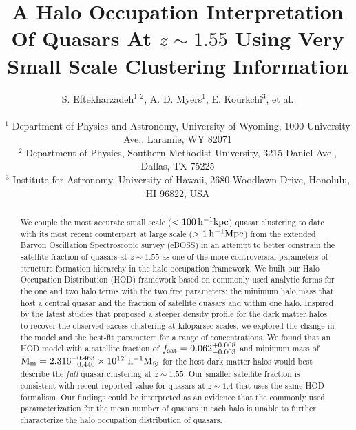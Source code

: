 \documentclass[useAMS,usenatbib]{mn2e}
\begin{document}

\title[Quasar HOD at $z \sim 1.5$]{A Halo Occupation Interpretation Of Quasars At $z\sim1.55$ Using Very Small Scale Clustering Information}
% 
\author[Eftekharzadeh et al.]{S. Eftekharzadeh$^{1,2}$,  A. D. Myers$^{1}$, E. Kourkchi$^{3}$, et al.\\
\\
$^{1}$ Department of Physics and Astronomy, University of Wyoming, 1000 University Ave., Laramie, WY 82071\\
$^{2}$ Department of Physics, Southern Methodist University, 3215 Daniel Ave., Dallas, TX 75225\\
$^{3}$ Institute for Astronomy, University of Hawaii, 2680 Woodlawn Drive, Honolulu, HI 96822, USA}
\maketitle


\begin{abstract}
We couple the most accurate small scale ($< 100\, \rm h^{-1}kpc$) quasar clustering 
to date with its most recent counterpart at large scale ($> 1\, \rm h^{-1}Mpc$) 
from the extended Baryon Oscillation Spectroscopic survey (eBOSS) in an attempt 
to better constrain the satellite fraction of quasars at $z\sim 1.55$ as one of the more controversial 
parameters of structure formation hierarchy in the halo occupation framework. 
We built our Halo Occupation Distribution (HOD) framework based on commonly 
used analytic forms for the one and two halo terms with the two free 
parameters: the minimum halo mass that host a central quasar and the fraction of satellite quasars and within one halo. 
Inspired by the latest studies that proposed a steeper density profile for the dark 
matter halos to recover the observed excess clustering at kiloparsec scales, we 
explored the change in the model and the best-fit parameters for a range of 
concentrations. We found that an HOD model with a satellite fraction of $f_{\rm 
sat} = 0.062_{-0.003}^{+0.008}$ and minimum mass of $\rm M_{m} = 
2.316_{-0.440}^{+0.463} \times 10^{12}\, \, \rm h^{-1} M_{\odot}$ for the host dark matter 
halos would best describe the {\it full} quasar clustering at $z \sim 1.55$. Our 
smaller satellite fraction is consistent with recent reported value for 
quasars at $z\sim 1.4$ that uses the same HOD formalism. Our findings could be interpreted as an evidence that the commonly used parameterization for the mean number of quasars in each 
halo is unable to further characterize the halo occupation distribution of 
quasars.   



\end{abstract}
\end{document}
